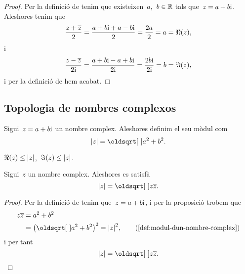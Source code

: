 \documentclass[../analisi-complexa.tex]{subfiles}
\begin{document}
    \begin{proof}
        Per la definició de  tenim que
        existeixen~\(a\),~\(b\in\mathbb{R}\) tals que~\(z = a+b\mathrm{i}\).
        Aleshores tenim que
        \[
            \frac{z+\overline{z}}{2} = \frac{a+b\mathrm{i}+a-b\mathrm{i}}{2}
                                     = \frac{2a}{2} = a = \Re(z),
        \]
        i
        \[
            \frac{z-\overline{z}}{2\mathrm{i}} = \frac{a+b\mathrm{i}-a+b\mathrm{i}}{2\mathrm{i}}
                                        = \frac{2b\mathrm{i}}{2\mathrm{i}} = b = \Im(z),
        \]
        i per la definició
        de  hem
        acabat.
    \end{proof}
    \subsection{Topologia de nombres complexos}
    \begin{definition}
        \label{def:modul-dun-nombre-complex}
        Sigui~\(z = a+b\mathrm{i}\) un nombre complex.
        Aleshores definim el seu mòdul com
        \[
            \modul{z} = \sqrt{a^{2}+b^{2}}.
        \]
    \end{definition}
    \begin{observation}
        \label{obs:les-parts-real-i-imaginaries-dun-complex-son-menors-que-el-seu-modul}
        \label{obs:la-part-real-dun-complex-es-menor-que-el-seu-modul}
        \label{obs:la-part-imaginaria-dun-complex-es-menor-que-el-seu-modul}
        \(\Re(z) \leq \modul{z}\),~\(\Im(z) \leq \modul{z}\).
    \end{observation}
    \begin{proposition}
        \label{prop:el-modul-dun-nombre-complex-es-larrel-del-nombre-pel-seu-conjugat}
        Sigui~\(z\) un nombre complex.
        Aleshores es satisfà
        \[
            \modul{z} = \sqrt{z\conjugat{z}}.
        \]
    \end{proposition}
    \begin{proof}
        Per la definició de  tenim
        que~\(z = a+b\mathrm{i}\), i per la
        proposició 
        trobem que
        \begin{align*}
            z\conjugat{z} &= a^{2}+b^{2} \\
                          &= \big(\sqrt{a^{2}+b^{2}}\big)^{2}
                           = \modul{z}^{2},
                          \tag{\ref{def:modul-dun-nombre-complex}}
        \end{align*}
        i per tant
        \[
            \modul{z} = \sqrt{z\conjugat{z}}.\qedhere
        \]
    \end{proof}
\end{document}
